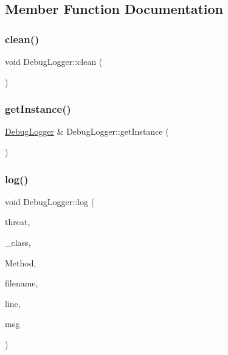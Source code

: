\subsection{Member Function Documentation}
\hypertarget{class_ori_engine_1_1_debug_logger_aaed348f81d341ecae87c9f61a40eb3bf}{}\label{class_ori_engine_1_1_debug_logger_aaed348f81d341ecae87c9f61a40eb3bf} 
\subsubsection{\texorpdfstring{clean()}{clean()}}
{\footnotesize\ttfamily void Debug\+Logger\+::clean (\begin{DoxyParamCaption}{ }\end{DoxyParamCaption})}

\hypertarget{class_ori_engine_1_1_debug_logger_a4005bb3158755d94376f1f45ac36dbbe}{}\label{class_ori_engine_1_1_debug_logger_a4005bb3158755d94376f1f45ac36dbbe} 
\subsubsection{\texorpdfstring{get\+Instance()}{getInstance()}}
{\footnotesize\ttfamily \hyperlink{class_ori_engine_1_1_debug_logger}{Debug\+Logger} \& Debug\+Logger\+::get\+Instance (\begin{DoxyParamCaption}{ }\end{DoxyParamCaption})\hspace{0.3cm}{\ttfamily [static]}}

\hypertarget{class_ori_engine_1_1_debug_logger_a879e4e9ae75084e9994fd987b8f05705}{}\label{class_ori_engine_1_1_debug_logger_a879e4e9ae75084e9994fd987b8f05705} 
\subsubsection{\texorpdfstring{log()}{log()}}
{\footnotesize\ttfamily void Debug\+Logger\+::log (\begin{DoxyParamCaption}\item[{const \hyperlink{class_ori_engine_1_1_debug_logger_a3ac0c97517b3aecb4ea7bdb5b98e6fe5}{Msg\+Type}}]{threat,  }\item[{const std\+::string \&}]{\+\_\+class,  }\item[{const std\+::string}]{Method,  }\item[{const std\+::string \&}]{filename,  }\item[{const int}]{line,  }\item[{const std\+::string \&}]{msg }\end{DoxyParamCaption})}


